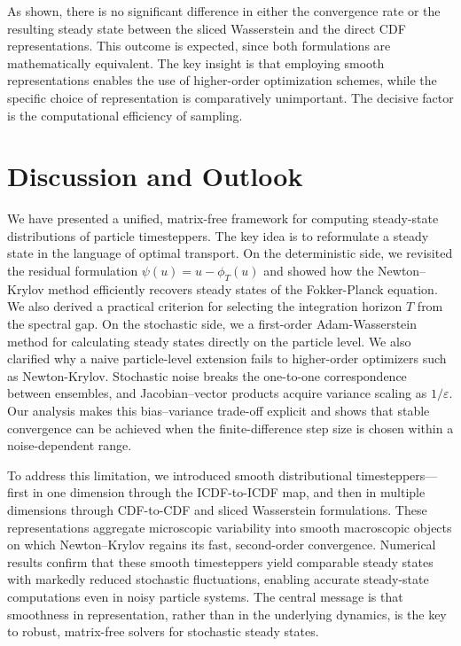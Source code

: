 \documentclass{article}
\begin{document}
As shown, there is no significant difference in either the convergence rate or the resulting steady state between the sliced Wasserstein and the direct CDF representations. This outcome is expected, since both formulations are mathematically equivalent. The key insight is that employing smooth representations enables the use of higher-order optimization schemes, while the specific choice of representation is comparatively unimportant. The decisive factor is the computational efficiency of sampling.

\section{Discussion and Outlook} \label{sec:conclusion}
We have presented a unified, matrix-free framework for computing steady-state distributions of particle timesteppers. The key idea is to reformulate a steady state in the language of optimal transport. On the deterministic side, we revisited the residual formulation $\psi(u) = u - \phi_T(u)$ and showed how the Newton–Krylov method efficiently recovers steady states of the Fokker-Planck equation. We also derived a practical criterion for selecting the integration horizon $T$ from the spectral gap. On the stochastic side, we a first-order Adam-Wasserstein method for calculating steady states directly on the particle level. We also clarified why a naive particle-level extension fails to higher-order optimizers such as Newton-Krylov. Stochastic noise breaks the one-to-one correspondence between ensembles, and Jacobian–vector products acquire variance scaling as $1/\varepsilon$. Our analysis makes this bias–variance trade-off explicit and shows that stable convergence can be achieved when the finite-difference step size is chosen within a noise-dependent range.

To address this limitation, we introduced smooth distributional timesteppers—first in one dimension through the ICDF-to-ICDF map, and then in multiple dimensions through CDF-to-CDF and sliced Wasserstein formulations. These representations aggregate microscopic variability into smooth macroscopic objects on which Newton–Krylov regains its fast, second-order convergence. Numerical results confirm that these smooth timesteppers yield comparable steady states with markedly reduced stochastic fluctuations, enabling accurate steady-state computations even in noisy particle systems. The central message is that smoothness in representation, rather than in the underlying dynamics, is the key to robust, matrix-free solvers for stochastic steady states.
\end{document}
